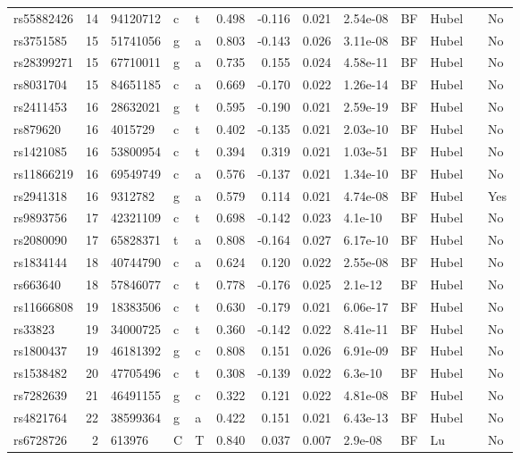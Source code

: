 \documentclass[11pt,twoside]{bristolthesis}
\begin{document}
\begin{longtable}[t]{lrlllrrrlllll}
rs55882426 & 14 & 94120712 & c & t & 0.498 & -0.116 & 0.021 & 2.54e-08 & BF & Hubel &  & No\\
rs3751585 & 15 & 51741056 & g & a & 0.803 & -0.143 & 0.026 & 3.11e-08 & BF & Hubel &  & No\\
rs28399271 & 15 & 67710011 & g & a & 0.735 & 0.155 & 0.024 & 4.58e-11 & BF & Hubel &  & No\\
\addlinespace
rs8031704 & 15 & 84651185 & c & a & 0.669 & -0.170 & 0.022 & 1.26e-14 & BF & Hubel &  & No\\
rs2411453 & 16 & 28632021 & g & t & 0.595 & -0.190 & 0.021 & 2.59e-19 & BF & Hubel &  & No\\
rs879620 & 16 & 4015729 & c & t & 0.402 & -0.135 & 0.021 & 2.03e-10 & BF & Hubel &  & No\\
rs1421085 & 16 & 53800954 & c & t & 0.394 & 0.319 & 0.021 & 1.03e-51 & BF & Hubel &  & No\\
rs11866219 & 16 & 69549749 & c & a & 0.576 & -0.137 & 0.021 & 1.34e-10 & BF & Hubel &  & No\\
\addlinespace
rs2941318 & 16 & 9312782 & g & a & 0.579 & 0.114 & 0.021 & 4.74e-08 & BF & Hubel &  & Yes\\
rs9893756 & 17 & 42321109 & c & t & 0.698 & -0.142 & 0.023 & 4.1e-10 & BF & Hubel &  & No\\
rs2080090 & 17 & 65828371 & t & a & 0.808 & -0.164 & 0.027 & 6.17e-10 & BF & Hubel &  & No\\
rs1834144 & 18 & 40744790 & c & a & 0.624 & 0.120 & 0.022 & 2.55e-08 & BF & Hubel &  & No\\
rs663640 & 18 & 57846077 & c & t & 0.778 & -0.176 & 0.025 & 2.1e-12 & BF & Hubel &  & No\\
\addlinespace
rs11666808 & 19 & 18383506 & c & t & 0.630 & -0.179 & 0.021 & 6.06e-17 & BF & Hubel &  & No\\
rs33823 & 19 & 34000725 & c & t & 0.360 & -0.142 & 0.022 & 8.41e-11 & BF & Hubel &  & No\\
rs1800437 & 19 & 46181392 & g & c & 0.808 & 0.151 & 0.026 & 6.91e-09 & BF & Hubel &  & No\\
rs1538482 & 20 & 47705496 & c & t & 0.308 & -0.139 & 0.022 & 6.3e-10 & BF & Hubel &  & No\\
rs7282639 & 21 & 46491155 & g & c & 0.322 & 0.121 & 0.022 & 4.81e-08 & BF & Hubel &  & No\\
\addlinespace
rs4821764 & 22 & 38599364 & g & a & 0.422 & 0.151 & 0.021 & 6.43e-13 & BF & Hubel &  & No\\
rs6728726 & 2 & 613976 & C & T & 0.840 & 0.037 & 0.007 & 2.9e-08 & BF & Lu &  & No\\

\end{longtable}
\end{document}
